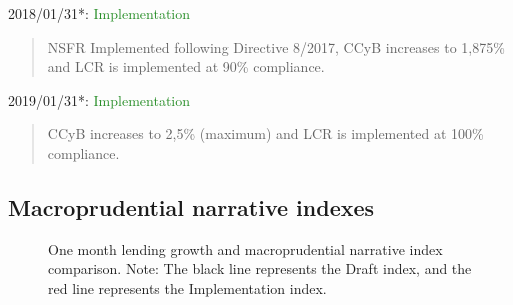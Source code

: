 \documentclass[
  letterpaper,
  DIV=11,
  numbers=noendperiod]{scrartcl}
\begin{document}
2018/01/31*: \textcolor{ForestGreen}{Implementation}

\begin{quote}
NSFR Implemented following  Directive 8/2017, CCyB increases to 1,875\% and LCR is implemented at 90\% compliance.
\end{quote}

2019/01/31*: \textcolor{ForestGreen}{Implementation}

\begin{quote}
CCyB increases to 2,5\% (maximum) and LCR is implemented at 100\% compliance.
\end{quote}

\subsection{Macroprudential narrative
indexes}\label{macroprudential-narrative-indexes}

\begin{figure}[H]


\caption{\label{fig-macro_narrative_indexes_one_month}One month lending
growth and macroprudential narrative index comparison. Note: The black
line represents the Draft index, and the red line represents the
Implementation index.}

\end{figure}%
\end{document}

